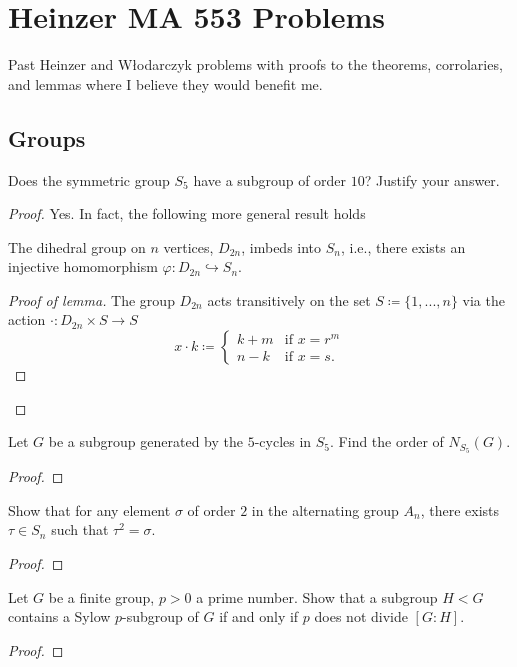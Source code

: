 \chapter{Heinzer MA 553 Problems}
Past Heinzer and Włodarczyk problems with proofs to the theorems,
corrolaries, and lemmas where I believe they would benefit me.
\section{Groups}
\begin{problem}
Does the symmetric group $S_5$ have a subgroup of order $10$? Justify your
answer.
\end{problem}
\begin{proof}
Yes. In fact, the following more general result holds
\begin{lemma}
The dihedral group on $n$ vertices, $D_{2n}$, imbeds into $S_n$, i.e.,
there exists an injective homomorphism $\varphi\colon D_{2n}\hookrightarrow
S_n$.
\end{lemma}
\begin{proof}[Proof of lemma]
\renewcommand\qedsymbol{$\clubsuit$}
The group $D_{2n}$ acts transitively on the set $S\coloneqq\{1,...,n\}$ via the
action $\cdot\colon D_{2n}\times S\to S$
\[
x\cdot k\coloneqq
\begin{cases}
k+m &\text{if $x=r^m$}\\
n-k&\text{if $x=s$}.
\end{cases}
\]
\end{proof}
\end{proof}

\begin{problem}
Let $G$ be a subgroup generated by the $5$-cycles in $S_5$. Find the order
of $N_{S_5}(G)$.
\end{problem}
\begin{proof}
\end{proof}

\begin{problem}
Show that for any element $\sigma$ of order $2$ in the
alternating group $A_n$, there exists $\tau\in S_n$ such that
$\tau^2=\sigma$.
\end{problem}
\begin{proof}
\end{proof}

\begin{problem}
Let $G$ be a finite group, $p>0$ a prime number. Show that a
subgroup $H<G$ contains a Sylow $p$-subgroup of $G$ if and only
if $p$ does not divide $[G:H]$.
\end{problem}
\begin{proof}
\end{proof}

